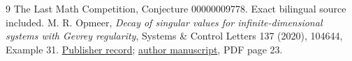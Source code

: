 \documentclass[11pt]{article}
\begin{document}
\begin{thebibliography}{9}
 The Last Math Competition,
Conjecture 00000009778. Exact bilingual source included.
 M. R. Opmeer,
\emph{Decay of singular values for infinite-dimensional systems
with Gevrey regularity}, Systems \& Control Letters 137 (2020),
104644, Example 31.
\href{https://doi.org/10.1016/j.sysconle.2020.104644}{Publisher record};
\href{https://purehost.bath.ac.uk/ws/portalfiles/portal/203458869/GevreySingularValues.pdf}{author manuscript},
PDF page 23.
\end{thebibliography}
\end{document}
